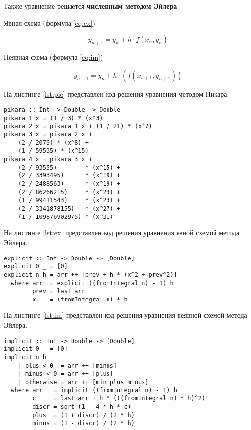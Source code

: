 Также уравнение решается \textbf{численным методом Эйлера}

Явная схема (формула \ref{eq:ex})

\begin{equation}\label{eq:ex}
    y_{n+1} = y_n + h \cdot f(x_n, y_n)
\end{equation}

Неявная схема (формула \ref{eq:im})

\begin{equation}\label{eq:im}
    y_{n+1} = y_n + h \cdot (f(x_{n+1}, y_{n+1}))
\end{equation}

На листинге \ref{lst:pic} представлен код решения уравнения методом
Пикара.

\begin{lstlisting}[label=lst:pic,caption=Метод Пикара]
pikara :: Int -> Double -> Double
pikara 1 x = (1 / 3) * (x^3)
pikara 2 x = pikara 1 x + (1 / 21) * (x^7)
pikara 3 x = pikara 2 x +
    (2 / 2079) * (x^8) +
    (1 / 59535) * (x^15)
pikara 4 x = pikara 3 x +
    (2 / 93555)        * (x^15) +
    (2 / 3393495)      * (x^19) +
    (2 / 2488563)      * (x^19) +
    (2 / 86266215)     * (x^23) +
    (1 / 99411543)     * (x^23) +
    (2 / 3341878155)   * (x^27) +
    (1 / 109876902975) * (x^31)
\end{lstlisting}


На листинге \ref{lst:ex} представлен код решения уравнения явной
схемой метода Эйлера.

\begin{lstlisting}[label=lst:ex,caption=Явная схема метода Эйлера]
explicit :: Int -> Double -> [Double]
explicit 0 _ = [0]
explicit n h = arr ++ [prev + h * (x^2 + prev^2)]
  where arr  = explicit ((fromIntegral n) - 1) h
        prev = last arr
        x    = (fromIntegral n) * h
\end{lstlisting}

На листинге \ref{lst:im} представлен код решения уравнения неявной
схемой метода Эйлера.

\begin{lstlisting}[label=lst:im,caption=Неявная схема метода Эйлера]
implicit :: Int -> Double -> [Double]
implicit 0 _ = [0]
implicit n h
    | plus < 0  = arr ++ [minus]
    | minus < 0 = arr ++ [plus]
    | otherwise = arr ++ [min plus minus]
  where arr   = implicit ((fromIntegral n) - 1) h
        c     = last arr + h * (((fromIntegral n) * h)^2)
        discr = sqrt (1 - 4 * h * c)
        plus  = (1 + discr) / (2 * h)
        minus = (1 - discr) / (2 * h)
\end{lstlisting}
